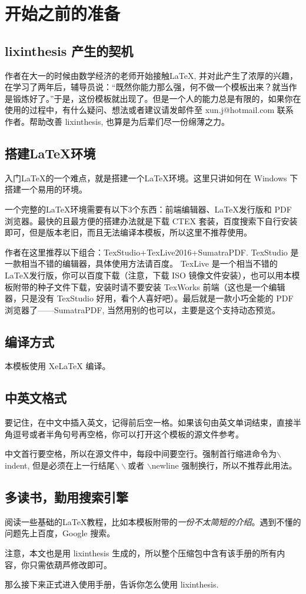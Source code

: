 \chapter{开始之前的准备}
\section{lixinthesis 产生的契机}
作者在大一的时候由数学经济的老师开始接触\LaTeX, 并对此产生了浓厚的兴趣，在学习了两年后，辅导员说：“既然你能力那么强，何不做一个模板出来？就当作是锻炼好了。”于是，这份模板就出现了。但是一个人的能力总是有限的，如果你在使用的过程中，有什么疑问、想法或者建议请发邮件至 {\sf xun.j@hotmail.com} 联系作者。帮助改善 lixinthesis, 也算是为后辈们尽一份绵薄之力。

\section{搭建\LaTeX 环境}
入门\LaTeX 的一个难点，就是搭建一个\LaTeX 环境。这里只讲如何在 Windows 下搭建一个易用的环境。

一个完整的\LaTeX 环境需要有以下3个东西：前端编辑器、\LaTeX 发行版和 PDF 浏览器。最快的且最方便的搭建办法就是下载 CTEX 套装，百度搜索下自行安装即可，但是版本老旧，而且无法编译本模板，所以这里不推荐使用。

作者在这里推荐以下组合：TexStudio+TexLive2016+SumatraPDF. TexStudio 是一款相当不错的编辑器，具体使用方法请百度。 TexLive 是一个相当不错的 \LaTeX 发行版，你可以百度下载（注意，下载 ISO 镜像文件安装），也可以用本模板附带的种子文件下载，安装时请不要安装 TexWorks 前端（这也是一个编辑器，只是没有 TexStudio 好用，看个人喜好吧）。最后就是一款小巧全能的 PDF 浏览器了——SumatraPDF, 当然用别的也可以，主要是这个支持动态预览。

\section{编译方式}
本模板使用 XeLaTeX 编译。

\section{中英文格式}
要记住，在中文中插入英文，记得前后空一格。如果该句由英文单词结束，直接半角逗号或者半角句号再空格，你可以打开这个模板的源文件参考。

中文首行要空格，所以在源文件中，每段中间要空行。强制首行缩进命令为$\backslash$indent, 但是必须在上一行结尾$\backslash\backslash$或者 $\backslash$newline 强制换行，所以不推荐此用法。

\section{多读书，勤用搜索引擎}
阅读一些基础的\LaTeX 教程，比如本模板附带的\emph{一份不太简短的\LaTeXe 介绍}。遇到不懂的问题先上百度，Google 搜索。

注意，本文也是用 lixinthesis 生成的，所以整个压缩包中含有该手册的所有内容，你只需依葫芦修改即可。

那么接下来正式进入使用手册，告诉你怎么使用 lixinthesis. 